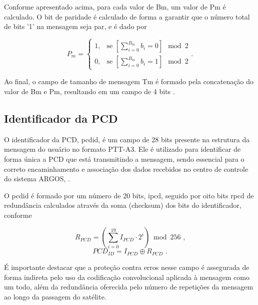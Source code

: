 Conforme apresentado acima, para cada valor de \gls{Bm}, um valor de \gls{Pm} é calculado. O bit de paridade é calculado de forma a garantir que o número total de bits '1' na mensagem seja par, e é dado por

\vspace{-1em}
\begin{equation}
    P_m = 
    \begin{cases}
    1, & \text{se } \left[ \sum_{i=0}^{B_m} b_i = 0 \right]\mod 2  \\
    0, & \text{se } \left[ \sum_{i=0}^{B_m} b_i = 1 \right]\mod 2 
    \end{cases} \text{.}
\end{equation}

\noindent Ao final, o campo de tamanho de mensagem \gls{Tm} é formado pela concatenação do valor de \gls{Bm} e \gls{Pm}, resultando em um campo de 4 bits \textcite{cnes_services_and_message_formats_ed2_rev2_2006}. 


\subsection{Identificador da PCD}

O identificador da \gls{PCD}, \gls{pcdid}, é um campo de 28 bits presente na estrutura da mensagem do usuário no formato \gls{PTT-A3}. Ele é utilizado para identificar de forma única a \gls{PCD} que está transmitindo a mensagem, sendo essencial para o correto encaminhamento e associação dos dados recebidos no centro de controle do sistema \gls{ARGOS}, \textcite{cnes_services_and_message_formats_ed2_rev2_2006}. 

O \gls{pcdid} é formado por um número de 20 bits, \gls{ipcd}, seguido por oito bits \gls{rpcd} de redundância calculados através da soma (checksum) dos bits do identificador, conforme

\vspace{-1em}
\begin{equation}
R_{PCD} = \left( \sum_{i=0}^{19} I_{PCD} \cdot 2^i \right) \bmod 256 \text{ ,}
\end{equation}
\vspace{-0.2em}
\begin{equation}
    PCD_{ID} = I_{PCD} \oplus R_{PCD} \text{ .}
\end{equation}

\noindent   É importante destacar que a proteção contra erros nesse campo é assegurada de forma indireta pelo uso da codificação convolucional aplicada à mensagem como um todo, além da redundância oferecida pelo número de repetições da mensagem ao longo da passagem do satélite. 


